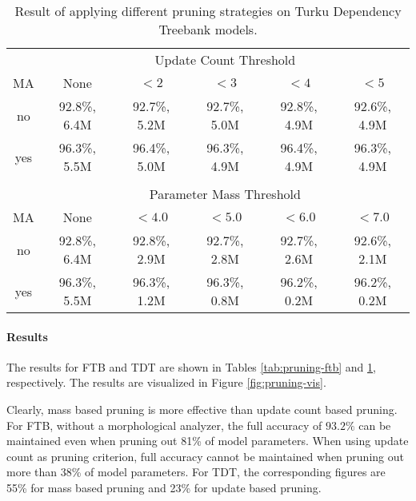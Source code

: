 \begin{table}[htb!]
\begin{center}
\begin{tabular}{c|ccccc}
\multicolumn{1}{c}{}                       & \multicolumn{5}{c}{Update Count Threshold}\\
MA                     & None            & $< 2$        & $< 3$        & $< 4$        & $< 5$       \\
\hline
no                     & 92.8\%, 6.4M    & 92.7\%, 5.2M & 92.7\%, 5.0M & 92.8\%, 4.9M & 92.6\%, 4.9M \\
yes                    & 96.3\%, 5.5M    & 96.4\%, 5.0M & 96.3\%, 4.9M & 96.4\%, 4.9M & 96.3\%, 4.9M \\
                       &                 &              &              &              &              \\
\multicolumn{1}{c}{}     & \multicolumn{5}{c}{Parameter Mass Threshold}\\
MA                     & None           & $< 4.0$        & $< 5.0$      & $< 6.0$      & $< 7.0$     \\
\hline
no                     & 92.8\%, 6.4M   & 92.8\%, 2.9M   & 92.7\%, 2.8M & 92.7\%, 2.6M & 92.6\%, 2.1M \\
yes                    & 96.3\%, 5.5M   & 96.3\%, 1.2M   & 96.3\%, 0.8M & 96.2\%, 0.2M & 96.2\%, 0.2M \\
\end{tabular}
\caption{Result of applying different pruning strategies on Turku Dependency Treebank models.}\label{tab:pruning-tdt}
\end{center}
\end{table}


\paragraph{Results} The results for FTB and TDT are shown in Tables
\ref{tab:pruning-ftb} and \ref{tab:pruning-tdt}, respectively. The
results are visualized in Figure \ref{fig:pruning-vis}.

Clearly, mass based pruning is more effective than update count based
pruning. For FTB, without a morphological analyzer, the full accuracy
of $93.2\%$ can be maintained even when pruning out 81\% of model
parameters. When using update count as pruning criterion, full
accuracy cannot be maintained when pruning out more than 38\% of model
parameters. For TDT, the corresponding figures are 55\% for mass based
pruning and 23\% for update based pruning.

